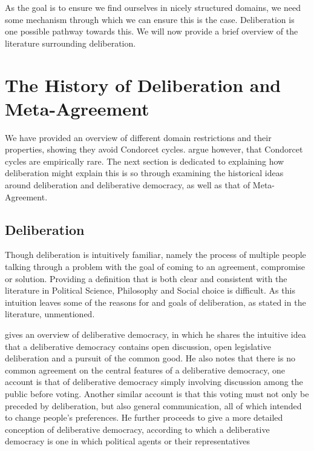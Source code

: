 As the goal is to ensure we find ourselves in nicely structured domains, we
need some mechanism through which we can ensure this is the case. Deliberation
is one possible pathway towards this. We will now provide a brief overview of the
literature surrounding deliberation.

\section{The History of Deliberation and Meta-Agreement}

We have provided an overview of different domain restrictions and their
properties, showing they avoid Condorcet cycles.
\citet{bochslerMarquisCondorcetGoes2010} argue however, that Condorcet cycles
are empirically rare. The next section is dedicated to explaining how
deliberation might explain this is so through examining the historical ideas
around deliberation and deliberative democracy, as well as that of
Meta-Agreement.

\subsection{Deliberation} 

Though deliberation is intuitively familiar, namely
the process of multiple people talking through a problem with the goal of
coming to an agreement, compromise or solution. Providing a definition that is
both clear and consistent with the literature in Political Science, Philosophy
and Social choice is difficult.  As this intuition leaves some of the reasons for
and goals of deliberation, as stated in the literature, unmentioned.



\citet{freemanDeliberativeDemocracySympathetic2000} gives an overview of deliberative democracy, in which he shares the intuitive idea that a deliberative democracy contains open discussion, open legislative deliberation and a pursuit of the common good. He also notes that there is no common agreement on the central features of a deliberative democracy, one account is that of deliberative democracy simply involving discussion among the public before voting. Another similar account is that this voting must not only be preceded by deliberation, but also general communication, all of which intended to change people's preferences. He further proceeds to give a more detailed conception of deliberative democracy, according to which a deliberative democracy is one in which political agents or their representatives

